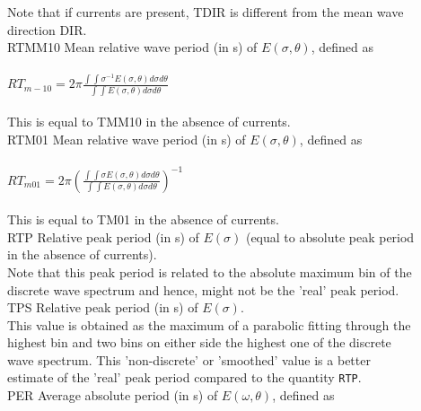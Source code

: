 \documentclass[12pt]{book}
\begin{document}
\begin{tabbing}
                        Note that if currents are present, TDIR is different from the mean wave\\
                        direction DIR.\-\\
RTMM10               \> Mean relative wave period (in s) of $E(\sigma,\theta)$, defined as\+\\
                     \\
$RT_{m-10} = 2\pi \frac{\int \int \sigma^{-1} E(\sigma, \theta) d\sigma d\theta}{\int \int E(\sigma, \theta) d\sigma d\theta}$ \\
                     \\
                     This is equal to TMM10 in the absence of currents.\-\\
RTM01             \> Mean relative wave period (in s) of $E(\sigma,\theta)$, defined as\+\\
                     \\
$RT_{m01} = 2\pi \left(\frac{\int \int \sigma E(\sigma, \theta) d\sigma d\theta}{\int \int E(\sigma, \theta) d\sigma d\theta} \right)^{-1}$ \\
                        \\
                        This is equal to TM01 in the absence of currents.\-\\
RTP                  \> Relative peak period (in s) of $E(\sigma)$ (equal to absolute peak period\+\\
                        in the absence of currents).\\
                        Note that this peak period is related to the absolute maximum bin of the\\
                        discrete wave spectrum and hence, might not be the 'real' peak period.\-\\
TPS                  \> Relative peak period (in s) of $E(\sigma)$.\+\\
                        This value is obtained as the maximum of a parabolic fitting through the\\
                        highest bin and two bins on either side the highest one of the discrete\\
                        wave spectrum. This 'non-discrete' or 'smoothed' value is a better\\
                        estimate of the 'real' peak period compared to the quantity {\tt RTP}.\-\\
PER                  \> Average absolute period (in s) of $E(\omega,\theta)$, defined as\+\\

\end{tabbing}
\end{document}
